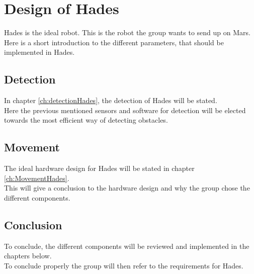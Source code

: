 \chapter{Design of Hades}
Hades is the ideal robot. This is the robot the group wants to send up on Mars.\\
Here is a short introduction to the different parameters, that should be implemented in Hades.

\section{Detection}
In chapter \ref{ch:detectionHades}, the detection of Hades will be stated.\\
Here the previous mentioned sensors and software for detection will be elected towards the most efficient way of detecting obstacles.

\section{Movement}
The ideal hardware design for Hades will be stated in chapter \ref{ch:MovementHades}.\\
This will give a conclusion to the hardware design and why the group chose the different components.

\section{Conclusion}
To conclude, the different components will be reviewed and implemented in the chapters below.\\
To conclude properly the group will then refer to the requirements for Hades.

